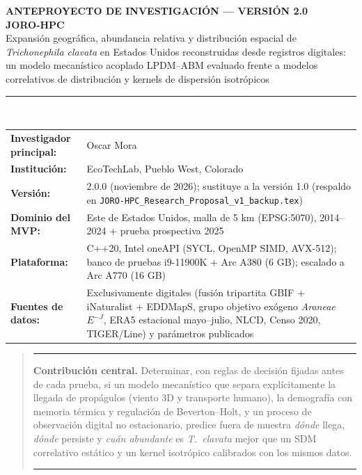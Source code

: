 \documentclass[11pt,letterpaper]{article}
\newenvironment{keybox}{\begin{quote}\color{navy}\hrule\vspace{2mm}}{\vspace{2mm}\hrule\end{quote}}
\begin{document}
\begin{titlepage}\thispagestyle{empty}\vspace*{0.4cm}
{\Large\color{teal}\textbf{ANTEPROYECTO DE INVESTIGACIÓN --- VERSIÓN 2.0}}\\[0.4cm]
{\Huge\bfseries\color{navy}JORO-HPC}\\[0.3cm]
{\Large Expansión geográfica, abundancia relativa y distribución espacial de \textit{Trichonephila clavata} en Estados Unidos reconstruidas desde registros digitales: un modelo mecanístico acoplado LPDM--ABM evaluado frente a modelos correlativos de distribución y kernels de dispersión isotrópicos}\\[0.6cm]
\rule{\textwidth}{1pt}\\[0.5cm]
\begin{tabularx}{\textwidth}{@{}>{\bfseries}l Y@{}}
Investigador principal: & Oscar Mora \\
Institución: & EcoTechLab, Pueblo West, Colorado \\
Versión: & 2.0.0 (noviembre de 2026); sustituye a la versión 1.0 (respaldo en \texttt{JORO-HPC\_Research\_Proposal\_v1\_backup.tex}) \\
Dominio del MVP: & Este de Estados Unidos, malla de 5 km (EPSG:5070), 2014--2024 + prueba prospectiva 2025 \\
Plataforma: & C++20, Intel oneAPI (SYCL, OpenMP SIMD, AVX-512); banco de pruebas i9-11900K + Arc A380 (6 GB); escalado a Arc A770 (16 GB) \\
Fuentes de datos: & Exclusivamente digitales (fusión tripartita GBIF + iNaturalist + EDDMapS, grupo objetivo exógeno \textit{Araneae} $E^{-J}$, ERA5 estacional mayo--julio, NLCD, Censo 2020, TIGER/Line) y parámetros publicados \\
\end{tabularx}
\vfill
\begin{keybox}\textbf{Contribución central.} Determinar, con reglas de decisión fijadas antes de cada prueba, si un modelo mecanístico que separa explícitamente la llegada de propágulos (viento 3D y transporte humano), la demografía con memoria térmica y regulación de Beverton--Holt, y un proceso de observación digital no estacionario, predice fuera de muestra \emph{dónde} llega, \emph{dónde} persiste y \emph{cuán abundante} es \textit{T.~clavata} mejor que un SDM correlativo estático y un kernel isotrópico calibrados con los mismos datos.\end{keybox}
\end{titlepage}
\tableofcontents\newpage
\end{document}
